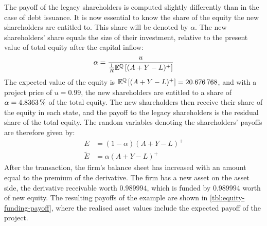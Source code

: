 \documentclass[main.tex]{subfiles}
\begin{document}
        The payoff of the legacy shareholders is computed slightly differently than in the case of debt issuance. 
        It is now essential to know the share of the equity the new shareholders are entitled to.
        This share will be denoted by $\alpha$.
        The new shareholders' share equals the size of their investment,
        relative to the present value of total equity after the capital inflow:
        \begin{equation*}
            \alpha = 
                \frac{
                    u
                }{
                    \frac{1}{R}
                    \mathbb{E}^{\mathbb{Q}}\left[
                        (A + Y - L)^{+}
                    \right]
                }
        \end{equation*}
        The expected value of the equity is 
        $\mathbb{E}^{\mathbb{Q}}\left[(A + Y - L)^{+}\right] = \num{20.676768}$,
        and with a project price of $u = 0.99$, the new shareholders are entitled to a share of
        $\alpha = \pct{0.048363}$ of the total equity.
        The new shareholders then receive their share of the equity in each state, 
        and the payoff to the legacy shareholders is the residual share of the total equity.
        The random variables denoting the shareholders' payoffs are therefore given by:
            \begin{align*}
                E 
                &= 
                (1 - \alpha)
                (A + Y - L)^{+} 
                \\
                \tilde{E}
                &=
                \alpha
                (A + Y - L)^{+}
            \end{align*}
        \indent
        After the transaction, the firm's balance sheet has increased with an amount equal to the premium of the derivative. 
        The firm has a new asset on the asset side, the derivative receivable worth $\num{0.989994}$, 
        which is funded by $\num{0.989994}$ worth of new equity.
        The resulting payoffs of the example are shown in \cref{tbl:equity-funding-payoff},
        where the realised asset values include the expected payoff of the project.
\end{document}
